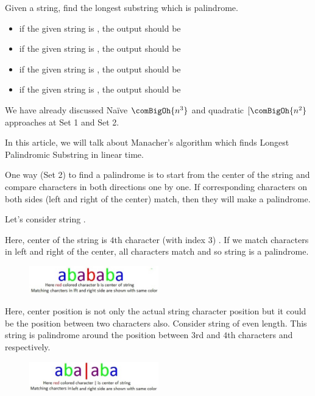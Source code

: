 Given a string, find the longest substring which is palindrome.
\begin{itemize}[noitemsep,topsep=0pt]
\item if the given string is , the output should be
\item if the given string is , the output should be 
\item if the given string is , the output should be
\item if the given string is , the output should be
\end{itemize}
We have already discussed Na\"ive $\comBigOh{n^3}$ and quadratic
$[\comBigOh{n^2}$ approaches at Set 1 and Set 2.

In this article, we will talk about Manacher's algorithm which finds Longest
Palindromic Substring in linear time.

One way (Set 2) to find a palindrome is to start from the center of the
string and compare characters in both directions one by one. If
corresponding characters on both sides (left and right of the center) match,
then they will make a palindrome.

Let's consider string .

Here, center of the string is $4$th character (with index $3$) . If
we match characters in left and right of the center, all characters match
and so string  is a palindrome.

\begin{figure}
\centering
\includegraphics[width=0.5\textwidth]{Images/figGFGPalinManacher1}
\end{figure}

Here, center position is not only the actual string character position but it
could be the position between two characters also.  Consider string
 of even length. This string is palindrome around the position
between $3$rd and $4$th characters  and  respectively.

\begin{figure}
\centering
\includegraphics[width=0.5\textwidth]{Images/figGFGPalinManacher2}
\end{figure}


